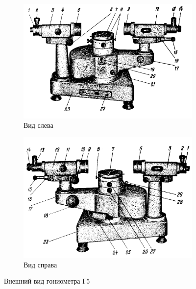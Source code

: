 \newpage
\begin{figure}[h!]
    \centering
    \begin{subfigure}{0.6\textwidth}
        \centering
        \includegraphics[width=13cm]{images/gonimetr.png}
        \caption{Вид слева}
    \end{subfigure}
    \begin{subfigure}{0.6\textwidth}
        \centering
        \includegraphics[width=13cm]{images/setup2.png}
        \caption{Вид справа}
    \end{subfigure}
    \caption{Внешний вид гониометра Г5} \label{figure:gonimetr}
\end{figure}

\newpage

